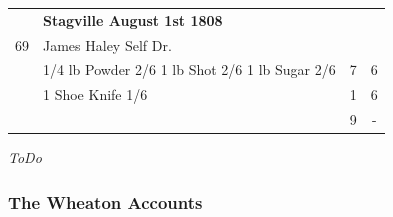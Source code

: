 \documentclass[12pt,a4paper]{article}
\begin{document}
\begin{tabular}{clcc}
  & \textbf{Stagville August 1st 1808}\\
 69 & James Haley Self Dr. & &\\
    & 1/4 lb Powder 2/6 1 lb Shot 2/6 1 lb Sugar 2/6 & 7 & 6\\
	& 1 Shoe Knife 1/6  & 1 & 6\\
	& & 9  & -
\end{tabular}
\medskip
\begin{center}
\textit{ToDo}
\end{center}

\subsubsection{The Wheaton Accounts}
\end{document}
